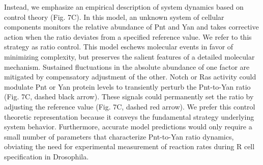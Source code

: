 Instead, we emphasize an empirical description of system dynamics based on control theory (Fig. 7C). In this model, an unknown system of cellular components monitors the relative abundance of Pnt and Yan and takes corrective action when the ratio deviates from a specified reference value. We refer to this strategy as ratio control. This model eschews molecular events in favor of minimizing complexity, but preserves the salient features of a detailed molecular mechanism. Sustained fluctuations in the absolute abundance of one factor are mitigated by compensatory adjustment of the other. Notch or Ras activity could modulate Pnt or Yan protein levels to transiently perturb the Pnt-to-Yan ratio (Fig. 7C, dashed black arrow). These signals could permanently set the ratio by adjusting the reference value (Fig. 7C, dashed red arrow). We prefer this control theoretic representation because it conveys the fundamental strategy underlying system behavior. Furthermore, accurate model predictions would only require a small number of parameters that characterize Pnt-to-Yan ratio dynamics, obviating the need for experimental measurement of reaction rates during R cell specification in Drosophila.

